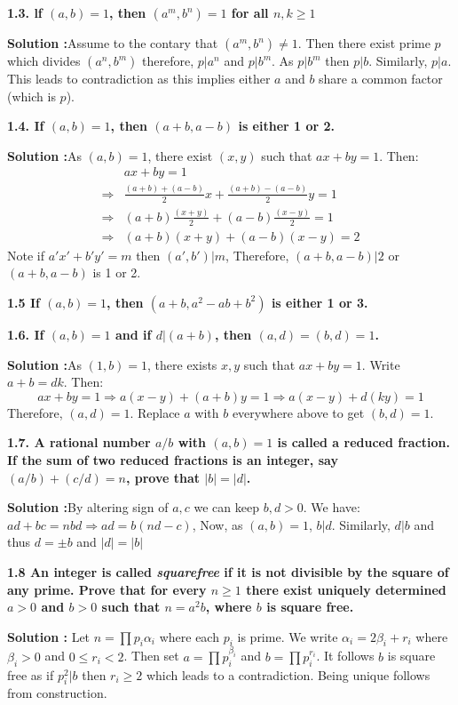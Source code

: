 \documentclass[oneside]{book}
\begin{document}
\begin{tcolorbox}
\textbf{1.3. lf $(a, b)= 1$, then $(a^m, b^n) = 1$ for all $n,k\geq 1$ }
\end{tcolorbox}
\textbf{Solution :}Assume to the contary that $(a^m,b^n)\ne 1$. Then there exist prime $p$ which divides $(a^n,b^m)$ therefore, $p|a^n$ and $p|b^m$. As $p|b^m$ then $p|b$. Similarly, $p|a$. This leads to contradiction as this implies either $a$ and $b$ share a common factor (which is $p$).\
\begin{tcolorbox}
\textbf{1.4. If $(a, b)= 1$, then $(a+ b, a-b)$ is either 1 or 2.}
\end{tcolorbox}
\textbf{Solution :}As $(a,b)=1$, there exist $(x,y)$ such that $ax+by=1$. Then:
\begin{align*}
    &ax+by=1\\
    \Rightarrow&\frac{(a+b)+(a-b)}{2}x+\frac{(a+b)-(a-b)}{2}y=1\\
    \Rightarrow&(a+b)\frac{(x+y)}{2}+(a-b)\frac{(x-y)}{2}=1\\
    \Rightarrow&(a+b)(x+y)+(a-b)(x-y)=2
\end{align*}
Note if $a'x'+b'y'=m$ then $(a',b')|m$, Therefore, $(a+b,a-b)|2$ or $(a+b,a-b)$ is 1 or 2.

\begin{tcolorbox}
\textbf{1.5 If $(a, b) = 1$, then $(a + b, a^2 - ab + b^2 )$ is either 1 or 3.} 
\end{tcolorbox}




\begin{tcolorbox}
\textbf{1.6. If $(a, b)= 1$ and if $d|(a +b)$, then $(a, d)= (b, d)= 1$. }
\end{tcolorbox}
\textbf{Solution :}As $(1,b)=1$, there exists $x,y$ such that $ax+by=1$. Write $a+b=dk$. Then:
$$ax+by=1\Rightarrow a(x-y)+(a+b)y=1\Rightarrow a(x-y)+d(ky)=1$$
Therefore, $(a,d)=1$. Replace $a$ with $b$ everywhere above to get $(b,d)=1$.


\begin{tcolorbox}
\textbf{1.7. A rational number $a/b$ with $(a, b) = 1$ is called a reduced fraction. If the sum of two 
reduced fractions is an integer, say $(a/b)+ (c/d) = n$, prove that $|b|=|d|$.}
\end{tcolorbox}
\textbf{Solution :}By altering sign of $a,c$ we can keep $b,d>0$. We have: $ad+bc=nbd\Rightarrow ad=b(nd-c)$, Now, as $(a,b)=1$, $b|d$. Similarly, $d|b$ and thus $d=\pm b$ and $|d|=|b|$



\begin{tcolorbox}
\textbf{1.8 An integer is called \textit{squarefree} if it is not divisible by the square of any prime. Prove 
that for every $n \geq 1$ there exist uniquely determined $a > 0$ and $b > 0$ such that 
$n = a^2b$, where $b$ is square free. } 
\end{tcolorbox}
\textbf{Solution :}
Let $n=\prod p_i{\alpha_i}$ where each $p_i$ is prime. We write $\alpha_i=2\beta_i+r_i$ where $\beta_i>0$ and $0\leq r_i<2$. Then set $a=\prod p_i^{\beta_i}$ and $b=\prod p_i^{r_i}$. It follows $b$ is square free as if $p_i^2|b$ then $r_i\geq2$ which leads to a contradiction. Being unique follows from construction.
\end{document}
